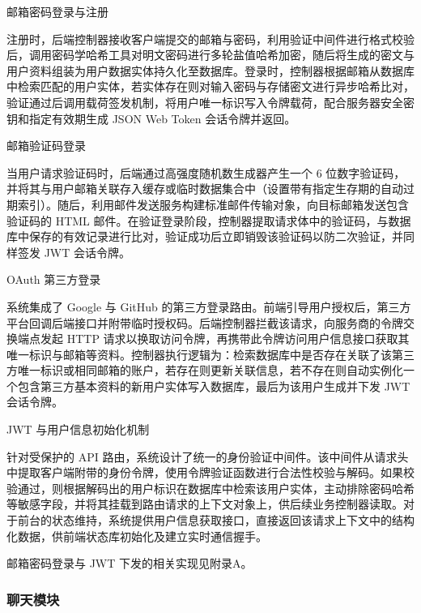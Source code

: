 \begin{usecaselist}

\item 邮箱密码登录与注册

注册时，后端控制器接收客户端提交的邮箱与密码，利用验证中间件进行格式校验后，调用密码学哈希工具对明文密码进行多轮盐值哈希加密，随后将生成的密文与用户资料组装为用户数据实体持久化至数据库。登录时，控制器根据邮箱从数据库中检索匹配的用户实体，若实体存在则对输入密码与存储密文进行异步哈希比对，验证通过后调用载荷签发机制，将用户唯一标识写入令牌载荷，配合服务器安全密钥和指定有效期生成 JSON Web Token 会话令牌并返回。

\item 邮箱验证码登录

当用户请求验证码时，后端通过高强度随机数生成器产生一个 6 位数字验证码，并将其与用户邮箱关联存入缓存或临时数据集合中（设置带有指定生存期的自动过期索引）。随后，利用邮件发送服务构建标准邮件传输对象，向目标邮箱发送包含验证码的 HTML 邮件。在验证登录阶段，控制器提取请求体中的验证码，与数据库中保存的有效记录进行比对，验证成功后立即销毁该验证码以防二次验证，并同样签发 JWT 会话令牌。

\item OAuth 第三方登录

系统集成了 Google 与 GitHub 的第三方登录路由。前端引导用户授权后，第三方平台回调后端接口并附带临时授权码。后端控制器拦截该请求，向服务商的令牌交换端点发起 HTTP 请求以换取访问令牌，再携带此令牌访问用户信息接口获取其唯一标识与邮箱等资料。控制器执行逻辑为：检索数据库中是否存在关联了该第三方唯一标识或相同邮箱的账户，若存在则更新关联信息，若不存在则自动实例化一个包含第三方基本资料的新用户实体写入数据库，最后为该用户生成并下发 JWT 会话令牌。

\item JWT 与用户信息初始化机制

针对受保护的 API 路由，系统设计了统一的身份验证中间件。该中间件从请求头中提取客户端附带的身份令牌，使用令牌验证函数进行合法性校验与解码。如果校验通过，则根据解码出的用户标识在数据库中检索该用户实体，主动排除密码哈希等敏感字段，并将其挂载到路由请求的上下文对象上，供后续业务控制器读取。对于前台的状态维持，系统提供用户信息获取接口，直接返回该请求上下文中的结构化数据，供前端状态库初始化及建立实时通信握手。

\end{usecaselist}

邮箱密码登录与 JWT 下发的相关实现见附录A。

\subsubsection{聊天模块}

